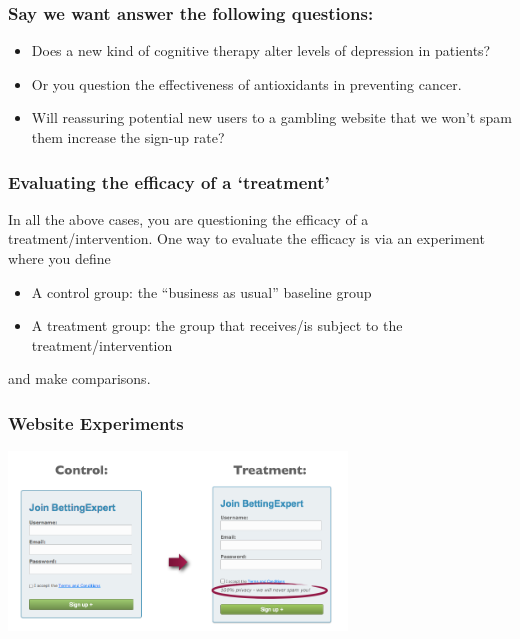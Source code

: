 \documentclass[handout]{beamer}
\newcommand{\blue}[1]{\textcolor{blue2}{#1}}
\begin{document}
\begin{frame}
\frametitle{Say we want answer the following questions:}
\begin{itemize}
\pause\item Does a new kind of cognitive therapy alter levels of depression in patients?
\pause\item Or you question the effectiveness of antioxidants in preventing cancer.
\pause\item Will reassuring potential new users to a gambling website that we won't spam them increase the sign-up rate?
\end{itemize}

\end{frame}



\begin{frame}
\frametitle{Evaluating the efficacy of a `treatment'}
In all the above cases, you are questioning the efficacy of a \blue{treatment/intervention}.  One way to evaluate the efficacy is via an \blue{experiment} where you define
\begin{itemize}
\pause\item A \blue{control} group: the ``business as usual'' baseline group
\pause\item A \blue{treatment} group:  the group that receives/is subject to the treatment/intervention
\end{itemize}
\pause and make comparisons.

\end{frame}



\begin{frame}
\frametitle{Website Experiments}
\begin{center}
\includegraphics[width=9cm]{figure/control_treatment.png}
\end{center}
\end{frame}
\end{document}

